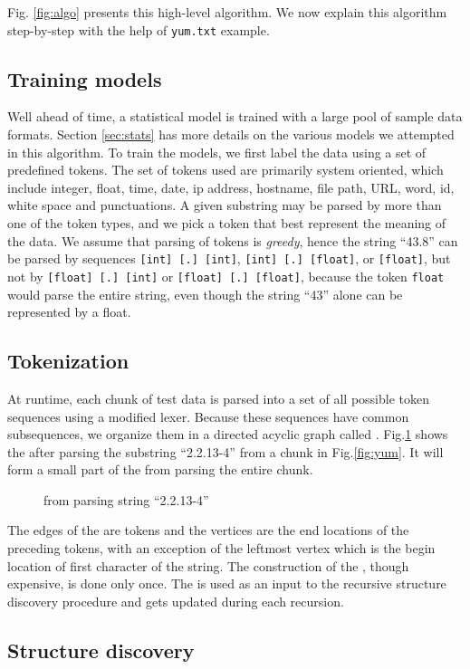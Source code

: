 Fig. \ref{fig:algo} presents this high-level algorithm. We now explain
this algorithm step-by-step with the help of {\tt yum.txt} example.

\subsection{Training models}
Well ahead of time, a statistical model is trained with
a large pool of sample data formats. Section \ref{sec:stats} has more details
on the various models we attempted in this algorithm. To train the models,
we first label the data using a set of predefined tokens. The set of tokens
used are primarily system oriented, which include
integer, float, time, date, ip address, hostname, file path, URL, 
word, id, white space and punctuations. 
A given substring may be parsed by more than one of the token
types, and we pick a token that best represent the meaning of the data.
We assume that parsing of tokens is {\em greedy}, hence
the string ``43.8'' can be parsed by sequences 
{\tt [int] [.] [int]}, {\tt [int] [.] [float]}, or {\tt [float]},
but not by {\tt [float] [.] [int]} or {\tt [float] [.] [float]},
because the token {\tt float} would parse the entire string, even though
the string ``43'' alone can be represented by a float.

\subsection{Tokenization}
At runtime, each chunk of test data is parsed into a set of all possible 
token sequences using a modified lexer. Because these sequences have
common subsequences, we organize them in a directed acyclic graph
called \seqset. Fig.\ref{fig:seqset} shows the \seqset{} after parsing 
the substring ``2.2.13-4'' from a chunk in Fig.\ref{fig:yum}. It will
form a small part of the \seqset{} from parsing the entire chunk.

\begin{figure}[th]
\begin{center}
\end{center}
\caption{\seqset{} from parsing string ``2.2.13-4''}\label{fig:seqset}
\end{figure}

The edges of the \seqset{} are tokens and the vertices are the end locations
of the preceding tokens, with an exception of the leftmost vertex which
is the begin location of first character of the string.
The construction of the \seqset, though expensive, is done only once.
The \seqset{} is used as an input to the recursive structure discovery procedure
and gets updated during each recursion.

\subsection{Structure discovery}
